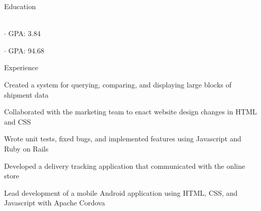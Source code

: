 \documentclass[]{deedy-resume-openfont}
\begin{document}
\iffalse
Space Standardization:
resumesection -> runsubsection
runsubsection -> addmargin -> descript
\fi

%
%

\sectionsep
%
%

\begin{resumesection}{Education}
\descript{}\hfill {}
\begin{addmargin}[1em]{0pt}
\hfill {}\\
 {$\cdot$ GPA: 3.84} \hfill {}
\end{addmargin}
\iffalse
\runsubsection{Pohang University of Science and Technology (Study Abroad)}\descript{}\hfill \location{Pohang, South Korea | Spring 2019}\\
\sectionsep
\vspace{-5pt}
\fi
\sectionsep
\vspace{-5pt}
 {$\cdot$ GPA: 94.68}\hfill  {}\\
\vspace{-3pt}
\end{resumesection}
%
%
\begin{resumesection}{Experience}
\newline
{}\hfill{}
\vspace{-5pt}
\begin{tightemize}
	\item Created a system for querying, comparing, and displaying large blocks of shipment data
	\item Collaborated with the marketing team to enact website design changes in HTML and CSS
	\item Wrote unit tests, fixed bugs, and implemented features using Javascript and Ruby on Rails
    \item Developed a delivery tracking application that communicated with the online store
\end{tightemize}
\vspace{7pt}   
\newline
{}
\vspace{-5pt}
\begin{tightemize}
	\item Lead development of a mobile Android application using HTML, CSS, and Javascript with Apache Cordova
\end{tightemize}
\end{resumesection}
\end{document}

